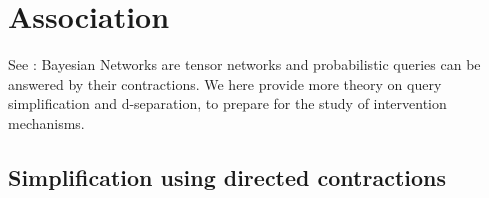 \section{Association}\label{sec:causalityAssociation}

See : Bayesian Networks are tensor networks and probabilistic queries can be answered by their contractions.
We here provide more theory on query simplification and d-separation, to prepare for the study of intervention mechanisms.




\subsection{Simplification using directed contractions}

